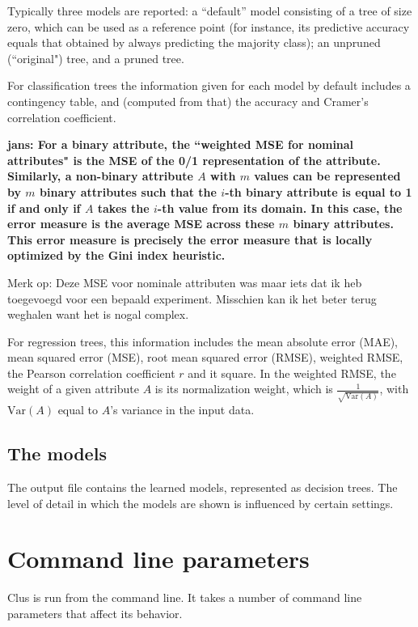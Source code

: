 \documentclass[a4paper]{report}
\begin{document}
Typically three models are reported: a ``default'' model consisting of a tree of size zero, which can be used as a reference point (for instance, its predictive accuracy equals that obtained by always predicting the majority class); an unpruned (``original") tree, and a pruned tree.

For classification trees the information given for each model by default includes a contingency table, and (computed from that) the accuracy and Cramer's correlation coefficient.

{\bf * jans: For a binary attribute, the ``weighted MSE for nominal attributes" is the MSE of the 0/1 representation of the attribute. Similarly, a non-binary attribute $A$ with $m$ values can be represented by $m$ binary attributes such that the $i$-th binary attribute is equal to 1 if and only if $A$ takes the $i$-th value from its domain. In this case, the error measure is the average MSE across these $m$ binary attributes. This error measure is precisely the error measure that is locally optimized by the Gini index heuristic.

Merk op: Deze MSE voor nominale attributen was maar iets dat ik heb toegevoegd voor een bepaald experiment. Misschien kan ik het beter terug weghalen want het is nogal complex.}

For regression trees, this information includes the mean absolute error (MAE), mean squared error (MSE), root mean squared error (RMSE), weighted RMSE, the Pearson correlation coefficient $r$ and it square.  In the weighted RMSE, the weight of a given attribute $A$ is its normalization weight, which is $\frac{1}{\sqrt{\mathrm{Var}(A)}}$, with $\mathrm{Var}(A)$ equal to $A$'s variance in the input data. 


\section{The models}

The output file contains the learned models, represented as decision trees.  The level of detail in which the models are shown is influenced by certain settings.


\chapter{Command line parameters}
\label{param:ch}

Clus is run from the command line.  It takes a number of command line parameters that affect its behavior.
\end{document}
